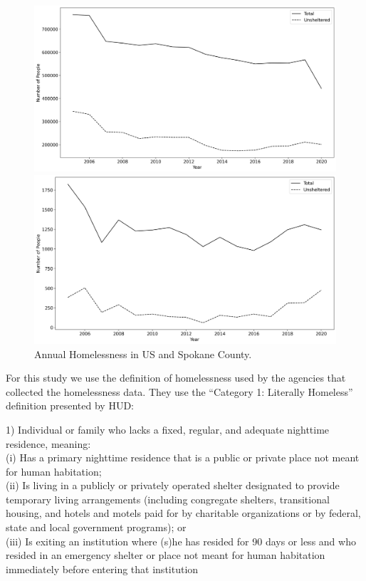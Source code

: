 \documentclass[12pt]{report}
\begin{document}
\begin{figure}[H]
    \begin{minipage}{0.5\textwidth}
        \includegraphics[width=\textwidth]{../img/homelessness_usa.png} 
    \end{minipage}
    \begin{minipage}{0.5\textwidth}
        \includegraphics[width=\textwidth]{../img/homelessness_spokane.png}
    \end{minipage}
    \caption[Annual Homelessness in US and Spokane County]{Annual Homelessness in US and Spokane County.
    \cite{PITcount}}
    \label{fig:Homeless_US_Spokane}
\end{figure}

For this study we use the definition of homelessness used by the agencies that collected the homelessness data. They use the ``Category 1: Literally Homeless'' definition presented by HUD:
\begin{displayquote}
1) Individual or family who lacks a fixed, regular, and adequate nighttime residence, meaning: \\
(i) Has a primary nighttime residence that is a public or private place not meant for human habitation; \\
(ii) Is living in a publicly or privately operated shelter designated to provide temporary living arrangements (including congregate shelters, transitional housing, and hotels and motels paid for by charitable organizations or by federal, state and local government programs); or \\
(iii) Is exiting an institution where (s)he has resided for 90 days or less and who resided in an emergency shelter or place not meant for human habitation immediately before entering that institution
\end{displayquote}
\end{document}
